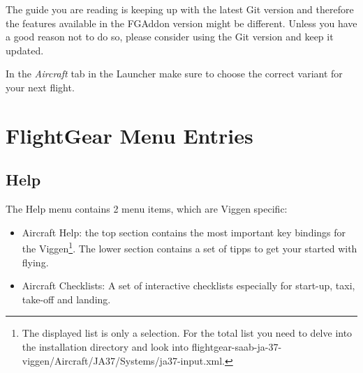 The guide you are reading is keeping up with the latest Git version and therefore the features available in the FGAddon version might be different. Unless you have a good reason not to do so, please consider using the Git version and keep it updated.


In the \emph{Aircraft} tab in the Launcher make sure to choose the correct variant for your next flight.

\chapter{FlightGear Menu Entries}
\section{Help}
The Help menu contains 2 menu items, which are Viggen specific:
\begin{itemize}
\item Aircraft Help: the top section contains the most important key bindings for the Viggen\footnote{The displayed list is only a selection. For the total list you need to delve into the installation directory and look into flightgear-saab-ja-37-viggen/Aircraft/JA37/Systems/ja37-input.xml.}. The lower section contains a set of tipps to get your started with flying.
\item Aircraft Checklists: A set of interactive checklists especially for start-up, taxi, take-off and landing.
\end{itemize}

